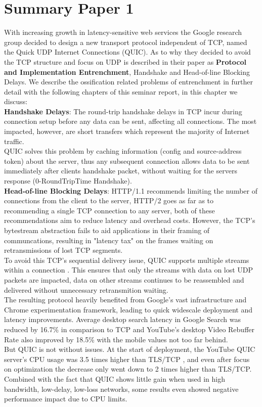\section{Summary Paper 1}
\label{sec:Summary Paper 1}
With increasing growth in latency-sensitive web services the Google research group decided to design a new transport protocol independent of TCP, named the Quick UDP Internet Connections (QUIC). As to why they decided to avoid the TCP structure and focus on UDP is described in their paper as \textbf{Protocol and Implementation Entrenchment}, Handshake and Head-of-line Blocking Delays. We describe the ossification related problems of entrenchment in further detail with the following chapters of this seminar report, in this chapter we discuss:\\
\hspace*{1em}\textbf{Handshake Delays}: The round-trip handshake delays in TCP incur during connection setup before any data can be sent, affecting all connections. The most impacted, however, are short transfers which represent the majority of Internet traffic. \\
QUIC solves this problem by caching information (config and source-address token) about the server, thus any subsequent connection allows data to be sent immediately after clients handshake packet, without waiting for the servers response (0-RoundTripTime Handshake). \\
\hspace*{1em}\textbf{Head-of-line Blocking Delays}: HTTP/1.1 recommends limiting the number of connections from the client to the server, HTTP/2 goes as far as to recommending a single TCP connection to any server, both of these recommendations aim to reduce latency and overhead costs. However, the TCP's bytestream abstraction fails to aid applications in their framing of communcations, resulting in "latency tax" \cite{langley2017quic} on the frames waiting on retransmissions of lost TCP segments.\\ 
To avoid this TCP's sequential delivery issue, QUIC supports multiple streams within a connection \cite{langley2017quic}. This ensures that only the streams with data on lost UDP packets are impacted, data on other streams continues to be reassembled and delivered without unnecessary retransmition waiting.\\
\hspace*{1em}The resulting protocol heavily benefited from Google's vast infrastructure and Chrome experimentation framework, leading to quick widescale deployment and latency improvements. Average desktop search latency in Google Search was reduced by 16.7\% in comparison to TCP and YouTube's desktop Video Rebuffer Rate also improved by 18.5\% with the mobile values not too far behind.\\
\hspace*{1em}But QUIC is not without issues. At the start of deployment, the YouTube QUIC server's CPU usage was 3.5 times higher than TLS/TCP \cite{langley2017quic}, and even after focus on optimization the decrease only went down to 2 times higher than TLS/TCP. Combined with the fact that QUIC shows little gain when used in high bandwidth, low-delay, low-loss networks, some results even showed negative performance impact due to CPU limits.


